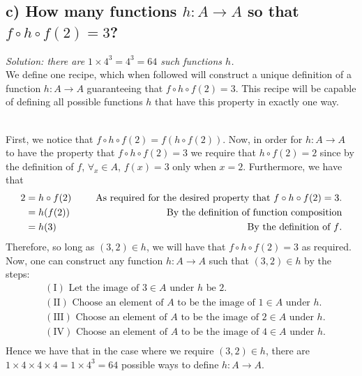 \documentclass[11pt, letterpaper]{article}
\begin{document}
\subsection*{c) How many functions $h:A\rightarrow A$ so that $f\circ h \circ f(2)=3$?}
{\large\it Solution: there are $1\times 4^3=4^3=64$ such functions $h$.}\\[0.25cm]
We define one recipe, which when followed will construct a unique definition of a function $h:A\rightarrow A$ guaranteeing that $f\circ h\circ f(2)=3$.
This recipe will be capable of defining all possible functions $h$ that have this property in exactly one way. 
\begin{recipe}~\\
    First, we notice that $f\circ h\circ f(2)=f(h\circ f(2))$. Now, in order for $h:A\rightarrow A$ to have the property that $f\circ h\circ f(2)=3$ we require that $h\circ f(2)=2$ since by the definition of $f$, $\forall_x\in A$, $f(x)=3$ only when $x=2$. Furthermore, we have that
    \begin{align*}
        2&=h\circ f(2) &\text{\indent As required for the desired property that $f\circ h\circ f(2)=3$.}\\
        &=h(f(2)) &\text{\indent By the definition of function composition}\\
        &=h(3) &\text{\indent By the definition of $f$.}
    \end{align*}
    Therefore, so long as $(3,2)\in h$, we will have that $f\circ h\circ f(2)=3$ as required. Now, one can construct any function $h:A\rightarrow A$ such that $(3,2)\in h$ by the steps:
    \begin{align*}
        &(\text{I}) \text{ Let the image of $3\in A$ under $h$ be 2.}\\
        &(\text{II}) \text{ Choose an element of $A$ to be the image of $1\in A$ under $h$.}\\
        &(\text{III}) \text{ Choose an element of $A$ to be the image of $2\in A$ under $h$.}\\
        &(\text{IV}) \text{ Choose an element of $A$ to be the image of $4\in A$ under $h$.}\\
    \end{align*}
    Hence we have that in the case where we require $(3,2)\in h$, there are $1\times 4\times 4\times 4 = 1\times 4^3=64$ possible ways to define $h:A\rightarrow A$. 
\end{recipe}
\end{document}
